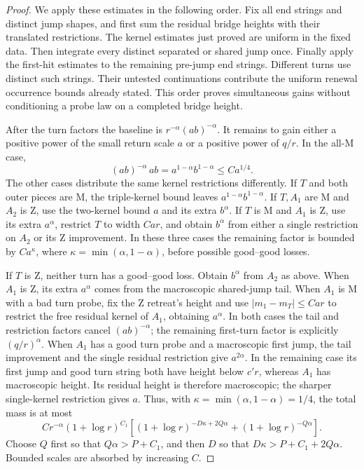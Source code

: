 \begin{proof}
We apply these estimates in the following order. Fix all end strings
and distinct jump shapes, and first sum the residual bridge heights
with their translated restrictions. The kernel estimates just proved
are uniform in the fixed data. Then integrate every distinct separated
or shared jump once. Finally apply the first-hit estimates to the
remaining pre-jump end strings. Different turns use distinct such
strings. Their untested continuations contribute the uniform renewal
occurrence bounds already stated. This order proves simultaneous gains
without conditioning a probe law on a completed bridge height.

After the turn factors the baseline is $r^{-\alpha}(ab)^{-\alpha}$.
It remains to gain either a positive power of the small return scale
$a$ or a positive power of $q/r$. In the all-$\mathrm M$ case,
\[
 (ab)^{-\alpha}\,ab=a^{1-\alpha}b^{1-\alpha}\le C a^{1/4}.
\]
The other cases distribute the same kernel restrictions differently.
If $T$ and both outer pieces are $\mathrm M$, the triple-kernel bound
leaves $a^{1-\alpha}b^{1-\alpha}$. If $T,A_1$ are $\mathrm M$ and $A_2$
is $\mathrm Z$, use the two-kernel bound $a$ and its extra $b^\alpha$.
If $T$ is $\mathrm M$ and $A_1$ is $\mathrm Z$, use its extra $a^\alpha$,
restrict $T$ to width $Car$, and obtain $b^\alpha$ from either a single
restriction on $A_2$ or its $\mathrm Z$ improvement. In these three cases the remaining factor is bounded by
$C a^{\kappa}$, where $\kappa=\min(\alpha,1-\alpha)$, before
possible good--good losses.

If $T$ is $\mathrm Z$, neither turn has a good--good loss. Obtain
$b^\alpha$ from $A_2$ as above. When $A_1$ is $\mathrm Z$, its extra
$a^\alpha$ comes from the macroscopic shared-jump tail. When $A_1$
is $\mathrm M$ with a bad turn probe, fix the $\mathrm Z$ retreat's
height and use $|m_1-m_T|\le Car$ to restrict the free residual kernel
of $A_1$, obtaining $a^\alpha$. In both cases the tail and restriction factors cancel
$(ab)^{-\alpha}$; the remaining first-turn factor is explicitly
$(q/r)^\alpha$. When $A_1$ has a good turn
probe and a macroscopic first jump, the tail improvement and the
single residual restriction give $a^{2\alpha}$. In the remaining case
its first jump and good turn string both have height below $c'r$,
whereas $A_1$ has macroscopic height. Its residual height is therefore
macroscopic; the sharper single-kernel restriction gives $a$.
Thus, with $\kappa=\min(\alpha,1-\alpha)=1/4$, the total mass is at most
\[
 C r^{-\alpha}(1+\log r)^{C_1}
 \left[(1+\log r)^{-D\kappa+2Q\alpha}
              +(1+\log r)^{-Q\alpha}\right].
\]
Choose $Q$ first so that $Q\alpha>P+C_1$, and then $D$ so that
$D\kappa>P+C_1+2Q\alpha$. Bounded scales are absorbed by increasing $C$.
\end{proof}

